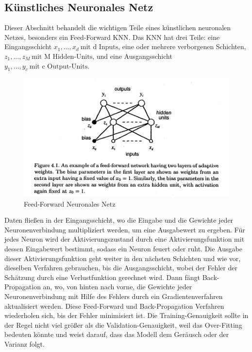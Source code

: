 \documentclass[12pt]{article}
\begin{document}
        \subsection{Künstliches Neuronales Netz}

            Dieser Abschnitt behandelt die wichtigen Teile eines künstlichen neuronalen Netzes, 
            besonders ein Feed-Forward KNN. Das KNN hat drei Teile: 
            eine Eingangsschicht \( x_1, ..., x_d \ \textrm{mit d Inputs} \),
            eine oder mehrere verborgenen Schichten, \( z_1, ..., z_M \ \textrm{mit M Hidden-Units} \),
            und eine Ausgangsschicht \( y_1, ..., y_c \ \textrm{mit c Output-Units} \).
            
            \begin{figure}[htp]
            
                \begin{center}

                    \includegraphics[scale=1]{neuronales-netz-bishop.png}
                    \caption{Feed-Forward Neuronales Netz \cite{bishop1995}}
        
                \end{center}
                
            \end{figure}
        
            Daten fließen in der Eingangsschicht, wo die Eingabe und die Gewichte jeder Neuronenverbindung multipliziert werden, 
            um eine Ausgabewert zu ergeben. 
            Für jedes Neuron wird der Aktivierungszustand durch eine Aktivierungsfunktion mit dessen Eingabewert bestimmt, 
            sodass ein Neuron feuert oder ruht. Die Ausgabe dieser Aktivierungsfunktion geht weiter in den nächsten Schichten und wie vor, 
            dieselben Verfahren gebrauchen, bis die Ausgangsschicht, wobei der Fehler der Schätzung durch eine Verlustfunktion gerechnet wird. 
            Dann fängt Back-Propagation an, wo, von hinten nach vorne, die Gewichte jeder Neuronenverbindung 
            mit Hilfe des Fehlers durch ein Gradientenverfahren aktualisiert werden. 
            Diese Feed-Forward und Back-Propagation Verfahren wiederholen sich, bis der Fehler minimisiert ist. 
            Die Training-Genauigkeit sollte in der Regel nicht viel größer als die Validation-Genauigkeit,
            weil das Over-Fitting bedeuten könnte und weist darauf, dass das Modell dem Geräusch oder der Varianz folgt.
\end{document}
